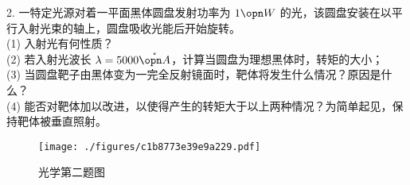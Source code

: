 2. 一特定光源对着一平面黑体圆盘发射功率为 $1\opn W$ 的光，该圆盘安装在以平行入射光束的轴上，圆盘吸收光能后开始旋转。\\
(1) 入射光有何性质？\\
(2) 若入射光波长 $\lambda=5000 \mathring{\opn A}$，计算当圆盘为理想黑体时，转矩的大小；\\
(3) 当圆盘靶子由黑体变为一完全反射镜面时，靶体将发生什么情况？原因是什么？\\
(4) 能否对靶体加以改进，以使得产生的转矩大于以上两种情况？为简单起见，保持靶体被垂直照射。
\begin{figure}[ht]
\centering
\texttt{[image: ./figures/c1b8773e39e9a229.pdf]}
\caption{光学第二题图} \label{fig_NJU13_3}
\end{figure}
